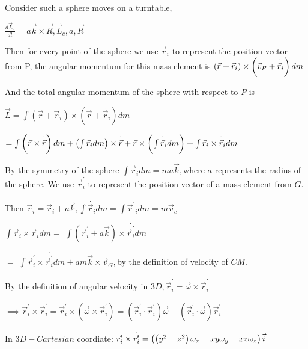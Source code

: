 \documentclass{article}
\begin{document}
\bigskip Consider such a sphere moves on a turntable, 

$\frac{d\vec{L}_{c}}{dt}=a\vec{k}\times \vec{R},\vec{L}_{c},a,\vec{R}$

Then for every point of the sphere we use $\vec{r}_{i}$ to represent the
position vector from P, the angular momentum for this mass element is $%
\left( \vec{r}+\vec{r}_{i}\right) \times \left( \vec{v}_{P}+\overset{\cdot }{%
\vec{r}}_{i}\right) dm$

And the total angular momentum of the sphere with respect to $P$ is

$\vec{L}=\int \left( \vec{r}+\vec{r}_{i}\right) \times \left( \overset{\cdot 
}{\vec{r}}+\overset{\cdot }{\vec{r}}_{i}\right) dm$

$=\int \left( \vec{r}\times \overset{\cdot }{\vec{r}}\right) dm+\left( \int 
\vec{r}_{i}dm\right) \times \overset{\cdot }{\vec{r}}+\vec{r}\times \left(
\int \overset{\cdot }{\vec{r}}_{i}dm\right) +\int \vec{r}_{i}\times \overset{%
\cdot }{\vec{r}}_{i}dm$

By the symmetry of the sphere $\int \vec{r}_{i}dm=ma\vec{k},$where $a$
represents the radius of the sphere. We use $\vec{r}_{i}^{\prime }$ to
represent the position vector of a mass element from $G.$

Then $\vec{r}_{i}=\vec{r}_{i}^{\prime }+a\vec{k},\int \overset{\cdot }{\vec{r%
}}_{i}dm=\int \overset{\cdot }{\vec{r}^{\prime }}_{i}dm=m\vec{v}_{c}$

$\int \vec{r}_{i}\times \overset{\cdot }{\vec{r}}_{i}dm=$ $\int \left( \vec{r%
}_{i}^{\prime }+a\vec{k}\right) \times \overset{\cdot }{\vec{r}_{i}^{\prime }%
}dm$

$=$ $\int \vec{r}_{i}^{\prime }\times \overset{\cdot }{\vec{r}_{i}^{\prime }}%
dm+am\vec{k}\times \vec{v}_{G},$by the definition of velocity of $CM.$

By the definition of angular velocity in $3D,\overset{\cdot }{\vec{r}%
_{i}^{\prime }}=\vec{\omega}\times \vec{r}_{i}^{\prime }$

$\implies \vec{r}_{i}^{\prime }\times \overset{\cdot }{\vec{r}_{i}^{\prime }}%
=\vec{r}_{i}^{\prime }\times \left( \vec{\omega}\times \vec{r}_{i}^{\prime
}\right) =\left( \vec{r}_{i}^{\prime }\cdot \vec{r}_{i}^{\prime }\right) 
\vec{\omega}-\left( \vec{r}_{i}^{\prime }\cdot \vec{\omega}\right) \vec{r}%
_{i}^{\prime }$

In $3D-Cartesian$ coordiate: $\vec{r}_{i}^{\prime }\times \overset{\cdot }{%
\vec{r}_{i}^{\prime }}=\left( \left( y^{2}+z^{2}\right) \omega _{x}-xy\omega
_{y}-xz\omega _{z}\right) \vec{i}$
\end{document}
